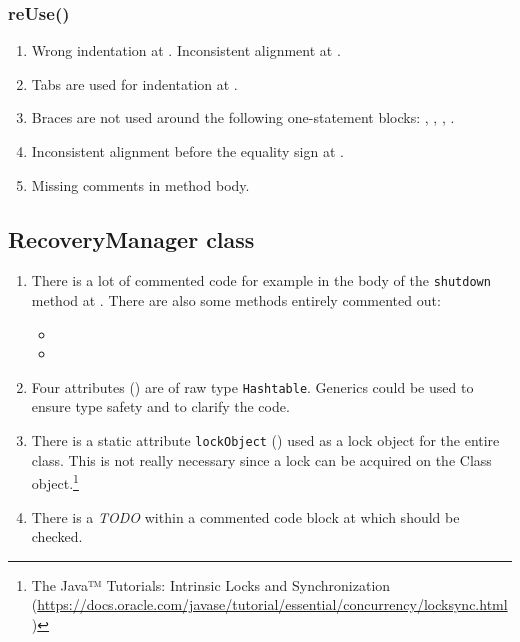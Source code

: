 \subsubsection{reUse()}
\begin{enumerate}
    \item {} Wrong indentation at . Inconsistent alignment at .
    \item {} Tabs are used for indentation at .
    \item {} Braces are not used around the following one-statement blocks: , , , .
    \item {} Inconsistent alignment before the equality sign at .
    \item {} Missing comments in method body.
\end{enumerate}

\subsection{RecoveryManager class}
\label{sec:recoverymanager-class}

\begin{enumerate}
	\item {} There is a lot of commented code for example in the body of the \texttt{shutdown} method at . There are also some methods entirely commented out:
	\begin{itemize}
		\item {}
		\item {}
	\end{itemize}
	\item {} Four attributes () are of raw type \texttt{Hashtable}. Generics could be used to ensure type safety and to clarify the code.
    \item There is a static attribute \texttt{lockObject} () used as a lock object for the entire class. This is not really necessary since a lock can be acquired on the Class object.\footnote{The Java™ Tutorials: Intrinsic Locks and Synchronization (\url{https://docs.oracle.com/javase/tutorial/essential/concurrency/locksync.html})}
    \item There is a \emph{TODO} within a commented code block at  which should be checked.
\end{enumerate}

